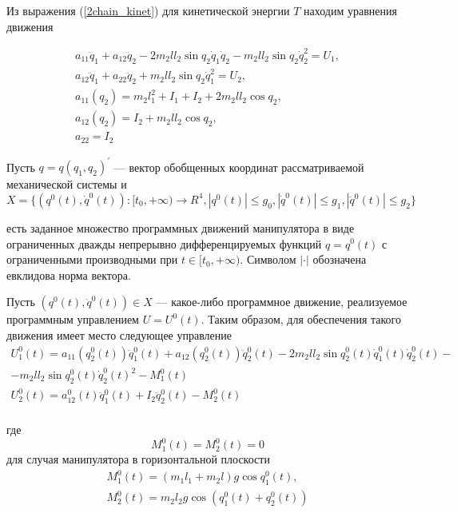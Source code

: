 Из выражения (\ref{2chain_kinet}) для кинетической энергии $T$ находим уравнения движения

\begin{equation}
\begin{array}{l}
a_{11} \ddot q_1 + a_{12} \ddot q_2 - 2 m_2 l l_2 \sin q_2 \dot q_1 \dot q_2 - m_2 l l_2 \sin q_2 \dot q_2^2 = U_1,\\ 
a_{12} \ddot q_1 + a_{22} \ddot q_2 + m_2 l l_2 \sin q_2 \dot q_1^2 = U_2,\\
a_{11} (q_2) = m_2 l_1^2 + I_1 + I_2 + 2 m_2 l l_2 \cos q_2,\\
a_{12} (q_2)= I_2 + m_2 l l_2 \cos q_2, \\
a_{22} = I_2
\end{array}
\end{equation}

Пусть $q=q(q_1, q_2)^{'}$ --– вектор обобщенных координат рассматриваемой механической системы и 
$$X = \{(q^0(t), \dot q^0(t)) : [t_0, + \infty) \to R^4, \left|q^0(t)\right| \le g_0, \left|\dot q^0(t) \right| \le g_1, \left|\ddot q^0(t)\right| \le g_2 \}$$

есть заданное множество программных движений манипулятора в виде ограниченных дважды непрерывно дифференцируемых функций $q=q^0(t)$ с ограниченными производными при $t \in [t_0, + \infty).$ Символом $\left| \cdot \right|$   обозначена евклидова норма вектора.

Пусть $(q^0(t), \dot q^0(t)) \in X$ --- какое-либо программное движение, реализуемое программным управлением $U = U^0(t).$ Таким образом, для обеспечения такого движения имеет место следующее управление
\begin{equation}
\begin{array}{l}
U_1^0 (t) = a_{11} (q_2^0 (t)) \ddot q_1^0 (t) + a_{12} (q_2^0 (t)) \ddot q_2^0 (t) - 2 m_2 l l_2 \sin q_2^0 (t) \dot q_1^0 (t) \dot q_2^0 (t) - \\ 
- m_2 l l_2 \sin q_2^0 (t) \dot q_2^0(t)^2 - M_1^0 (t) \\
U_2^0 (t) = a_{12}^0 (t) \ddot q_1^0 (t) + I_2 \ddot q_2^0 (t) - M_2^0 (t) \\
\end{array}
\end{equation}

где $$M_1^0(t) = M_2^0(t) = 0$$ для случая манипулятора в горизонтальной плоскости
\begin{equation}
\begin{array}{l}
M_1^0 (t) = (m_1 l_1 + m_2 l) g \cos q_1^0 (t), \\
M_2^0 (t) = m_2 l_2 g \cos (q_1^0 (t) + q_2^0 (t))
\end{array}
\end{equation}

